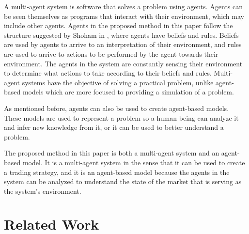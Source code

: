 \documentclass[review]{elsarticle}
\begin{document}
A multi-agent system is software that solves a problem using agents. Agents can
be seen themselves as programs that interact with their environment, which may
include other agents. Agents in the proposed method in this paper follow the
structure suggested by Shoham in \cite{shoham1993agent}, where agents have
beliefs and rules. Beliefs are used by agents to arrive to an interpretation of
their environment, and rules are used to arrive to actions to be performed by
the agent towards their environment. The agents in the system are constantly
sensing their environment to determine what actions to take according to their
beliefs and rules. Multi-agent systems have the objective of solving a practical
problem, unlike agent-based models which are more focused to providing a
simulation of a problem.

As mentioned before, agents can also be used to create agent-based models. These
models are used to represent a problem so a human being can analyze it and infer
new knowledge from it, or it can be used to better understand a problem.

The proposed method in this paper is both a multi-agent system and an
agent-based model. It is a multi-agent system in the sense that it can be used
to create a trading strategy, and it is an agent-based model because the agents
in the system can be analyzed to understand the state of the market that is
serving as the system's environment.



\section{Related Work}
\label{section:related-work}
\end{document}
